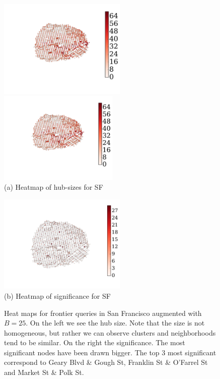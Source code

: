 \documentclass[opre,nonblindrev]{informs3} %
\begin{document}
\begin{figure}[h]
\begin{minipage}[t]{.53\textwidth}
\centering
\includegraphics[clip, trim=4.6cm 4.8cm 4.7cm 3cm,height=4.7cm]{TexImg/SF_hub_sizes.pdf}%
\includegraphics[clip, trim=15.8cm 0cm 0.4cm 1cm,height=4.4cm]{TexImg/SF_hub_sizes.pdf}\\
(a) Heatmap of hub-sizes for SF
\end{minipage}%
\begin{minipage}[t]{.47\textwidth}
\centering
\includegraphics[clip, trim=3.7cm 2.9cm 4.2cm 3cm,height=4.7cm]{TexImg/sig_colapse.pdf}\\
(b) Heatmap of significance for SF
\end{minipage}
\caption{Heat maps for frontier queries in San Francisco augmented with $B=25$.
On the left we see the hub size. 
Note that the size is not homogeneous, but rather we can observe clusters and neighborhoods tend to be similar.
On the right the significance.
The most significant nodes have been drawn bigger.
The top 3 most significant correspond to Geary Blvd \& Gough St, Franklin St \& O'Farrel St and Market St \& Polk St.
}
\label{fig:heat_maps}
\end{figure}
\end{document}
